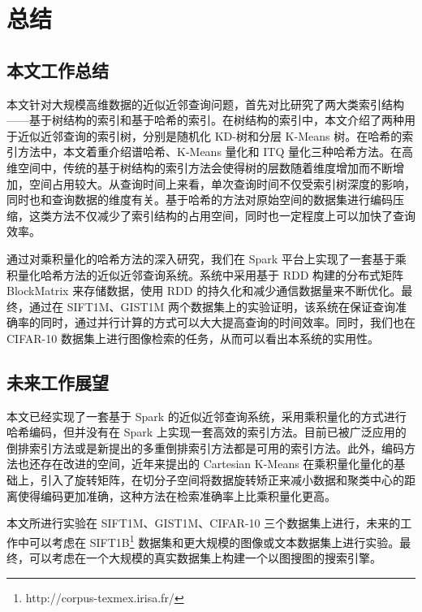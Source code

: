 

\chapter{总结}
\label{cha:conclusion}
\section{本文工作总结}
本文针对大规模高维数据的近似近邻查询问题，首先对比研究了两大类索引结构——基于树结构的索引和基于哈希的索引。在树结构的索引中，本文介绍了两种用于近似近邻查询的索引树，分别是随机化 KD-树和分层 K-Means 树。在哈希的索引方法中，本文着重介绍谱哈希、K-Means 量化和 ITQ 量化三种哈希方法。在高维空间中，传统的基于树结构的索引方法会使得树的层数随着维度增加而不断增加，空间占用较大。从查询时间上来看，单次查询时间不仅受索引树深度的影响，同时也和查询数据的维度有关。基于哈希的方法对原始空间的数据集进行编码压缩，这类方法不仅减少了索引结构的占用空间，同时也一定程度上可以加快了查询效率。

通过对乘积量化的哈希方法的深入研究，我们在 Spark 平台上实现了一套基于乘积量化哈希方法的近似近邻查询系统。系统中采用基于 RDD 构建的分布式矩阵 BlockMatrix 来存储数据，使用 RDD 的持久化和减少通信数据量来不断优化。最终，通过在 SIFT1M、GIST1M 两个数据集上的实验证明，该系统在保证查询准确率的同时，通过并行计算的方式可以大大提高查询的时间效率。同时，我们也在 CIFAR-10 数据集上进行图像检索的任务，从而可以看出本系统的实用性。
\section{未来工作展望}
本文已经实现了一套基于 Spark 的近似近邻查询系统，采用乘积量化的方式进行哈希编码，但并没有在 Spark 上实现一套高效的索引方法。目前已被广泛应用的倒排索引方法或是新提出的多重倒排索引方法\cite{BabenkoL12}都是可用的索引方法。此外，编码方法也还存在改进的空间，近年来提出的 Cartesian K-Means\cite{Norouzi13} 在乘积量化量化的基础上，引入了旋转矩阵，在切分子空间将数据旋转矫正来减小数据和聚类中心的距离使得编码更加准确，这种方法在检索准确率上比乘积量化更高。

本文所进行实验在 SIFT1M、GIST1M、CIFAR-10 三个数据集上进行，未来的工作中可以考虑在 SIFT1B\footnote{http://corpus-texmex.irisa.fr/} 数据集和更大规模的图像或文本数据集上进行实验。最终，可以考虑在一个大规模的真实数据集上构建一个以图搜图的搜索引擎。



